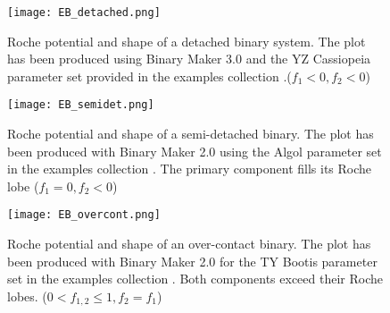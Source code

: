 \begin{figure}[!t]
\vspace{0cm}
\centerline{\texttt{[image: EB\_detached.png]}}
\caption{Roche potential and shape of a detached binary system. The plot has been produced using Binary Maker 3.0 and 
the YZ Cassiopeia parameter set provided in the examples collection \citep{bradstreet2005}.($f_{1}<0, f_{2} < 0$)}
\label{fig:eb_det}
\end{figure}
\begin{figure}[!t]
\vspace{0cm}
\centerline{\texttt{[image: EB\_semidet.png]}}
\caption{Roche potential and shape of a semi-detached binary. The plot has been produced with
Binary Maker 2.0 using the Algol parameter set in the examples collection \citep{bradstreet1993}. The primary component fills its Roche lobe 
($f_{1} = 0, f_{2} < 0$)}
\label{fig:eb_semidet}
\end{figure}
\begin{figure}[!t]
\vspace{0cm}
\centerline{\texttt{[image: EB\_overcont.png]}}
\caption{Roche potential and shape of an over-contact binary. The plot has been produced with
Binary Maker 2.0 for the TY Bootis parameter set in the examples collection \citep{bradstreet1993}.
Both components exceed their Roche lobes. ($0<f_{1,2}\leq1, f_{2} =f_{1}$)}
\label{fig:eb_overcont}
\end{figure}

